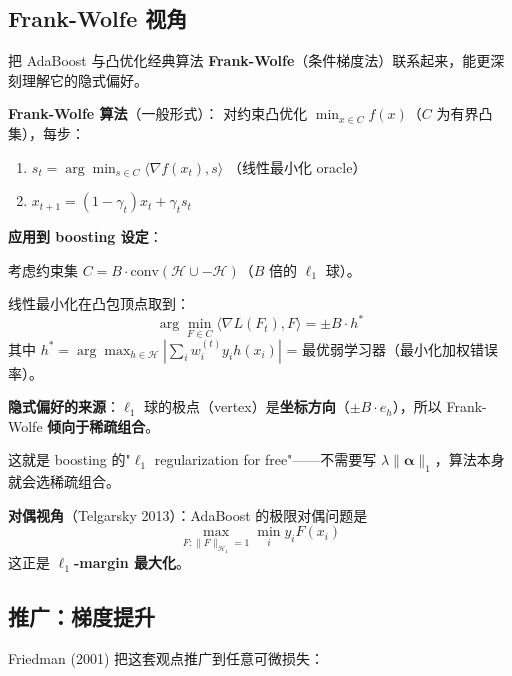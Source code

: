 \documentclass[12pt, a4paper]{ctexart}
\begin{document}
\subsection{Frank-Wolfe 视角}

把 AdaBoost 与凸优化经典算法 \textbf{Frank-Wolfe}（条件梯度法）联系起来，能更深刻理解它的隐式偏好。

\begin{blackboard}

\textbf{Frank-Wolfe 算法}（一般形式）：
对约束凸优化 $\min_{x \in C} f(x)$（$C$ 为有界凸集），每步：
\begin{enumerate}
\item $s_t = \arg\min_{s \in C} \langle \nabla f(x_t), s\rangle$ \quad（线性最小化 oracle）
\item $x_{t+1} = (1-\gamma_t) x_t + \gamma_t s_t$
\end{enumerate}

\textbf{应用到 boosting 设定}：

考虑约束集 $C = B \cdot \text{conv}(\mathcal{H} \cup -\mathcal{H})$（$B$ 倍的 $\ell_1$ 球）。

线性最小化在凸包顶点取到：
\[
\arg\min_{F \in C} \langle \nabla L(F_t), F \rangle = \pm B \cdot h^*
\]
其中 $h^* = \arg\max_{h \in \mathcal{H}} \left|\sum_i w_i^{(t)} y_i h(x_i)\right|$
\quad = 最优弱学习器（最小化加权错误率）。

\textbf{隐式偏好的来源}：$\ell_1$ 球的极点（vertex）是\textbf{坐标方向}（$\pm B \cdot e_h$），所以 Frank-Wolfe \textbf{倾向于稀疏组合}。

这就是 boosting 的"$\ell_1$ regularization for free"——不需要写 $\lambda \|\bm{\alpha}\|_1$，算法本身就会选稀疏组合。

\textbf{对偶视角}（Telgarsky 2013）：AdaBoost 的极限对偶问题是
\[
\max_{F: \|F\|_{\mathcal{H}_1} = 1} \min_i y_i F(x_i)
\]
这正是 \textbf{$\ell_1$-margin 最大化}。
\end{blackboard}

\subsection{推广：梯度提升}

Friedman (2001) 把这套观点推广到任意可微损失：
\end{document}
